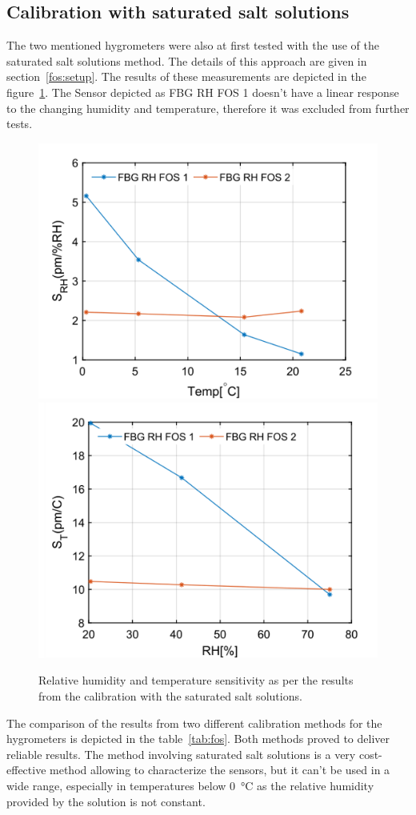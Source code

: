 \subsection{Calibration with saturated salt solutions}
The two mentioned hygrometers were also at first tested with the use of the saturated salt solutions method. The details of this approach are given in section~\ref{fos:setup}. The results of these measurements are depicted in the figure~\ref{fig:fos_salt}. The Sensor depicted as FBG RH FOS 1 doesn't have a linear response to the changing humidity and temperature, therefore it was excluded from further tests. 

\begin{figure}[!h]
\centering
\includegraphics[width=0.49\columnwidth]{Chapter5/images/salt_srh.png}
\includegraphics[width=0.49\columnwidth]{Chapter5/images/salt_st.png}
\caption{Relative humidity and temperature sensitivity as per the results from the calibration with the saturated salt solutions.}
\label{fig:fos_salt}
\end{figure}

The comparison of the results from two different calibration methods for the hygrometers is depicted in the table~\ref{tab:fos}. Both methods proved to deliver reliable results. The method involving saturated salt solutions is a very cost-effective method allowing to characterize the sensors, but it can't be used in a wide range, especially in temperatures below \SI{0}{\celsius} as the relative humidity provided by the solution is not constant. 

